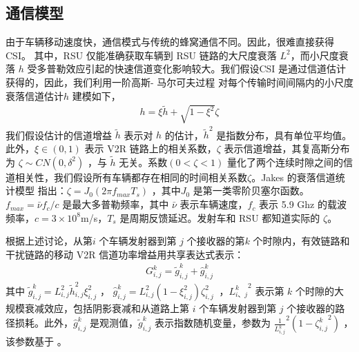 \subsection{通信模型}\label{section3-2-1}
由于车辆移动速度快，通信模式与传统的蜂窝通信不同。因此，很难直接获得 CSI。 其中，RSU 仅能准确获取车辆到 RSU 链路的大尺度衰落 $L^2$，而小尺度衰落 $h$ 受多普勒效应引起的快速信道变化影响较大。我们假设CSI 是通过信道估计获得的，因此，我们利用一阶高斯- 马尔可夫过程\cite{Kim2011} 对每个传输时间间隔内的小尺度衰落信道估计$h$ 建模如下，
\begin{eqnarray}\label{E1}
h=\xi{\widetilde{h}}+\sqrt{1-\xi^2}\zeta
\end{eqnarray}
我们假设估计的信道增益 $\widetilde{h}$ 表示对 $h$ 的估计，${\widetilde{h}}^2$ 是指数分布，具有单位平均值\cite{Sakr2014}。 此外，$\xi\in\left(0,1\right)$ 表示 V2R 链路上的相关系数，$\zeta$ 表示信道增益，其复高斯分布为 $\zeta\sim CN\left(0,\delta^2\right)$ ，与 $\widetilde{h}$ 无关。系数$\left(0<\zeta<1\right)$ 量化了两个连续时隙之间的信道相关性，我们假设所有车辆都存在相同的时间相关系数$\zeta$。Jakes 的衰落信道统计模型\cite{Kim2011} 指出：$\zeta=J_0\left(2\pi f_{max}T_s\right)$ ，其中$J_0$ 是第一类零阶贝塞尔函数。$f_{max}=\bar{\nu}f_c/c $ 是最大多普勒频率，其中 $\bar{\nu}$ 表示车辆速度，$f_c$ 表示 5.9 Ghz 的载波频率，$c=3\times{10}^8$m/s，$T_s$ 是周期反馈延迟。发射车和 RSU 都知道实际的 $\zeta$。

根据上述讨论，从第$ i$ 个车辆发射器到第 $j $ 个接收器的第$ k $ 个时隙内，有效链路和干扰链路的移动 V2R 信道功率增益用共享表达式表示：
\begin{eqnarray}\label{E2}
G_{i,j}^k={\widetilde{g}}_{i,j}^k+{\hat{g}}_{i,j}^k
\end{eqnarray}
其中 ${\widetilde{g}}_{i,j}^k=L_{i,j}^2{\widetilde{h}}_{i,j}^2\xi_{i,j}^2$ ， ${\hat{g}}_{i,j}^k=L_{i,j}^2\left(1-\xi_{i,j}^2\right)\zeta_{i,j}^2\ $ ，$ {L_{i、 j}^k}^2 $
表示第 $k $ 个时隙的大规模衰减效应，包括阴影衰减和从道路上第 $i$ 个车辆发射器到第 $ j $ 个接收器的路径损耗。此外，${\hat{g}}_{i,j}^k$ 是观测值，${\widetilde{g}}_{i,j}^k$ 表示指数随机变量，参数为 $\frac{1}{L_{i,j}^k}^2({1-{\zeta_{i,j}^k}^2}) $ ，该参数基于 \cite{Xie2020}。

